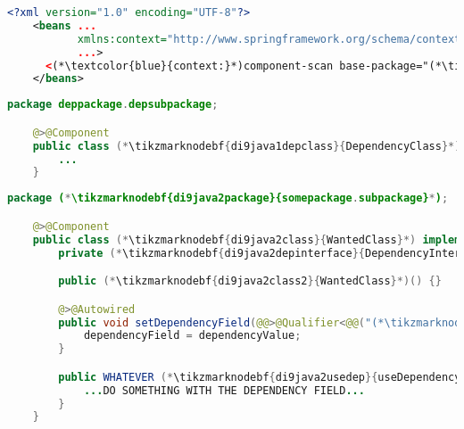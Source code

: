 \newpage

\begin{lstlisting}[language=XML, title={Configuration XML}]
    <?xml version="1.0" encoding="UTF-8"?>
    <beans ...
           xmlns:context="http://www.springframework.org/schema/context"
           ...>
      <(*\textcolor{blue}{context:}*)component-scan base-package="(*\tikzmarknodebf{di9xml1package}{somepackage.subpackage}[ForestGreen]*)"/>
    </beans>
\end{lstlisting}
\begin{lstlisting}[language=Java, title={Dependency class}]
    package deppackage.depsubpackage;

    @>@Component
    public class (*\tikzmarknodebf{di9java1depclass}{DependencyClass}*) implements (*\tikzmarknodebf{di9java1depinterface}{DependencyInterface}*) {
        ...
    }
\end{lstlisting}
\begin{lstlisting}[language=Java, title={Wanted class with the zero--parameter constructor and the setter method}]
    package (*\tikzmarknodebf{di9java2package}{somepackage.subpackage}*);

    @>@Component
    public class (*\tikzmarknodebf{di9java2class}{WantedClass}*) implements (*\tikzmarknodebf{di9java2interface}{WantedClassInterface}*) {
        private (*\tikzmarknodebf{di9java2depinterface}{DependencyInterface}*) dependencyField;

        public (*\tikzmarknodebf{di9java2class2}{WantedClass}*)() {}

        @>@Autowired
        public void setDependencyField(@@>@Qualifier<@@("(*\tikzmarknodebf{di9java2depbeanid}{dependencyClass}[ForestGreen]*)") (*\tikzmarknodebf{di9java2depinterface2}{DependencyInterface}*) dependencyValue) {
            dependencyField = dependencyValue;
        }

        public WHATEVER (*\tikzmarknodebf{di9java2usedep}{useDependency}*)() {
            ...DO SOMETHING WITH THE DEPENDENCY FIELD...
        }
    }
\end{lstlisting}

